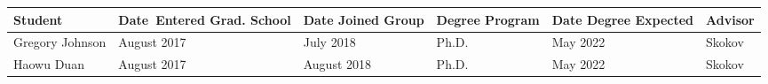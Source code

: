 \vspace{0.5em}

\begin{center}
\begin{tabular}{| p{16mm}| p{25mm}| p{22mm}| p{18mm}|p{25mm}|p{15mm}|  }                                                                              \hline
             Student & Date~Entered Grad. School  &   Date Joined Group & Degree Program 
			 & Date Degree Expected & Advisor \\
            \hline
             Gregory Johnson & August 2017 & July 2018  & Ph.D.  & May 2022  & Skokov \\ 
			 \hline
             Haowu Duan &  August 2017    & August 2018  & Ph.D.   & May 2022 & Skokov \\ 
			 \hline
        \end{tabular}

\end{center}
